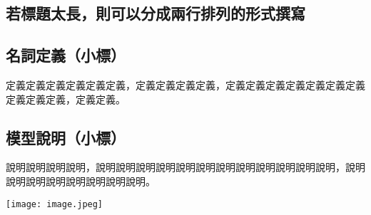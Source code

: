 \begin{ZhChapter}

\chapter{若標題太長，則可以分成兩行排列的形式撰寫}

\section{名詞定義（小標）}

定義定義定義定義定義定義\cite{latex2e}，定義定義定義定義，定義定義定義定義定義定義定義定義定義定義，定義定義。

\begin{table*}[htbp]
    \centering
    \caption{表格範例標題} \label{tab: complexity}
\end {table*}

\section{模型說明（小標）}

說明說明說明說明，說明說明說明說明說明說明說明說明說明說明說明說明，說明說明說明說明說明說明說明說明。

\begin{figure*}[htbp]
    \centering
    \texttt{[image: image.jpeg]}
    \caption{Cool train station}
    \label{fig: image}
\end{figure*}

\end{ZhChapter}